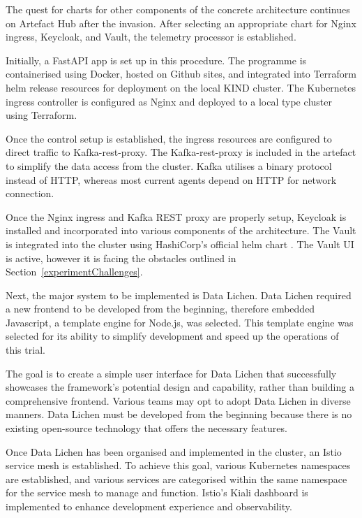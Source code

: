 \documentclass[journal]{IEEEtran}
\begin{document}
The quest for charts for other components of the concrete architecture continues on Artefact Hub after the invasion. After selecting an appropriate chart for Nginx ingress, Keycloak, and Vault, the telemetry processor is established. 

Initially, a FastAPI app is set up in this procedure. The programme is containerised using Docker, hosted on Github sites, and integrated into Terraform helm release resources for deployment on the local KIND cluster. The Kubernetes ingress controller is configured as Nginx and deployed to a local type cluster using Terraform. 

Once the control setup is established, the ingress resources are configured to direct traffic to Kafka-rest-proxy. The Kafka-rest-proxy is included in the artefact to simplify the data access from the cluster. Kafka utilises a binary protocol instead of HTTP, whereas most current agents depend on HTTP for network connection. 


Once the Nginx ingress and Kafka REST proxy are properly setup, Keycloak is installed and incorporated into various components of the architecture. The Vault is integrated into the cluster using HashiCorp's official helm chart \cite{HashiCorpVaultHelm2023}. The Vault UI is active, however it is facing the obstacles outlined in Section~\ref{experimentChallenges}. 

Next, the major system to be implemented is Data Lichen. Data Lichen required a new frontend to be developed from the beginning, therefore embedded Javascript, a template engine for Node.js, was selected. This template engine was selected for its ability to simplify development and speed up the operations of this trial. 

The goal is to create a simple user interface for Data Lichen that successfully showcases the framework's potential design and capability, rather than building a comprehensive frontend. Various teams may opt to adopt Data Lichen in diverse manners. Data Lichen must be developed from the beginning because there is no existing open-source technology that offers the necessary features.

Once Data Lichen has been organised and implemented in the cluster, an Istio service mesh is established. To achieve this goal, various Kubernetes namespaces are established, and various services are categorised within the same namespace for the service mesh to manage and function. Istio's Kiali dashboard is implemented to enhance development experience and observability. 
\end{document}
